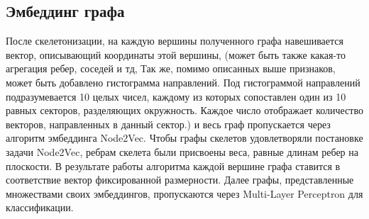 \documentclass[12pt, twoside]{article}
\begin{document}
\subsection{Эмбеддинг графа}
После скелетонизации, на каждую вершины полученного графа навешивается вектор, описывающий координаты этой вершины, (может быть также какая-то агрегация ребер, соседей и тд, Так же, помимо описанных выше признаков, может быть добавлено гистограмма направлений. Под гистограммой направлений подразумевается 10 целых чисел, каждому из которых сопоставлен один из 10 равных секторов, разделяющих окружность. Каждое число отображает количество векторов, направленных в данный сектор.) и весь граф пропускается через алгоритм эмбеддинга Node2Vec. Чтобы графы скелетов удовлетворяли постановке задачи Node2Vec, ребрам скелета были присвоены веса, равные длинам ребер на плоскости. В результате работы алгоритма каждой вершине графа ставится в соответствие вектор фиксированной размерности. Далее графы, представленные множествами своих эмбеддингов, пропускаются через Multi-Layer Perceptron для классификации.




\end{document}
